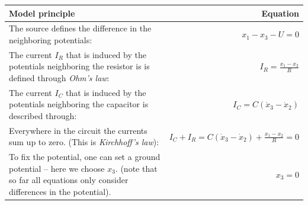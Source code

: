 \documentclass[]{book}
\theoremstyle{definition}
\theoremstyle{definition}
\theoremstyle{definition}
\theoremstyle{definition}
\theoremstyle{remark}
\begin{document}
\begin{longtable}[]{@{}lr@{}}
\toprule
\begin{minipage}[b]{0.66\columnwidth}\raggedright
Model principle\strut
\end{minipage} & \begin{minipage}[b]{0.28\columnwidth}\raggedleft
Equation\strut
\end{minipage}\tabularnewline
\midrule
\endhead
\begin{minipage}[t]{0.66\columnwidth}\raggedright
The source defines the difference in the neighboring potentials:\strut
\end{minipage} & \begin{minipage}[t]{0.28\columnwidth}\raggedleft
\(x_1 - x_3 - U = 0\)\strut
\end{minipage}\tabularnewline
\begin{minipage}[t]{0.66\columnwidth}\raggedright
The current \(I_R\) that is induced by the potentials neighboring the resistor is is defined through \emph{Ohm's law}:\strut
\end{minipage} & \begin{minipage}[t]{0.28\columnwidth}\raggedleft
\(I_R = \frac{x_1 - x_2}{R}\)\strut
\end{minipage}\tabularnewline
\begin{minipage}[t]{0.66\columnwidth}\raggedright
The current \(I_C\) that is induced by the potentials neighboring the capacitor is described through:\strut
\end{minipage} & \begin{minipage}[t]{0.28\columnwidth}\raggedleft
\(I_C = C(\dot x_3 - \dot x_2)\)\strut
\end{minipage}\tabularnewline
\begin{minipage}[t]{0.66\columnwidth}\raggedright
Everywhere in the circuit the currents sum up to zero. (This is \emph{Kirchhoff's law}):\strut
\end{minipage} & \begin{minipage}[t]{0.28\columnwidth}\raggedleft
\(I_C + I_R = C(\dot x_3 - \dot x_2)+ \frac{x_1 - x_2}{R}=0\)\strut
\end{minipage}\tabularnewline
\begin{minipage}[t]{0.66\columnwidth}\raggedright
To fix the potential, one can set a ground potential -- here we choose \(x_3\). (note that so far all equations only consider differences in the potential).\strut
\end{minipage} & \begin{minipage}[t]{0.28\columnwidth}\raggedleft
\(x_3 = 0\)\strut
\end{minipage}\tabularnewline
\bottomrule
\end{longtable}
\end{document}
